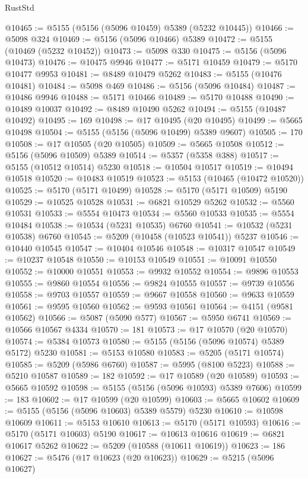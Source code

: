 \begin{lexlean}{RustStd}
\begin{coremodule}
@10465 := @5155 (@5156 (@5096 @10459) @5389 (@5232 @10445))
@10466 := @5098 @324
@10469 := @5156 (@5096 @10466) @5389
@10472 := @5155 (@10469 (@5232 @10452))
@10473 := @5098 @330
@10475 := @5156 (@5096 @10473)
@10476 := @10475 @9946
@10477 := @5171 @10459
@10479 := @5170 @10477 @9953
@10481 := @8489 @10479 @5262
@10483 := @5155 (@10476 @10481)
@10484 := @5098 @469
@10486 := @5156 (@5096 @10484)
@10487 := @10486 @9946
@10488 := @5171 @10466
@10489 := @5170 @10488
@10490 := @10489 @10037
@10492 := @8489 @10490 @5262
@10494 := @5155 (@10487 @10492)
@10495 := 169
@10498 := @17 @10495 (@20 @10495)
@10499 := @5665 @10498
@10504 := @5155 (@5156 (@5096 @10499) @5389 @9607)
@10505 := 170
@10508 := @17 @10505 (@20 @10505)
@10509 := @5665 @10508
@10512 := @5156 (@5096 @10509) @5389
@10514 := @5357 (@5358 @388)
@10517 := @5155 (@10512 @10514) @5230
@10518 := @10504 @10517
@10519 := @10494 @10518
@10520 := @10483 @10519
@10523 := @5153 (@10465 (@10472 @10520))
@10525 := @5170 (@5171 @10499)
@10528 := @5170 (@5171 @10509) @5190
@10529 := @10525 @10528
@10531 := @6821 @10529 @5262
@10532 := @5560 @10531
@10533 := @5554 @10473
@10534 := @5560 @10533
@10535 := @5554 @10484
@10538 := @10534 (@5231 @10535) @6760
@10541 := @10532 (@5231 @10538) @6760
@10545 := @5209 (@10458 (@10523 @10541)) @5237
@10546 := @10440 @10545
@10547 := @10404 @10546
@10548 := @10317 @10547
@10549 := @10237 @10548
@10550 := @10153 @10549
@10551 := @10091 @10550
@10552 := @10000 @10551
@10553 := @9932 @10552
@10554 := @9896 @10553
@10555 := @9860 @10554
@10556 := @9824 @10555
@10557 := @9739 @10556
@10558 := @9703 @10557
@10559 := @9667 @10558
@10560 := @9633 @10559
@10561 := @9595 @10560
@10562 := @9593 @10561
@10564 := @4151 (@9581 @10562)
@10566 := @5087 (@5090 @577)
@10567 := @5950 @6741
@10569 := @10566 @10567 @4334
@10570 := 181
@10573 := @17 @10570 (@20 @10570)
@10574 := @5384 @10573
@10580 := @5155 (@5156 (@5096 @10574) @5389 @5172) @5230
@10581 := @5153 @10580
@10583 := @5205 (@5171 @10574)
@10585 := @5209 (@5986 @6760)
@10587 := @5995 (@8100 @5223)
@10588 := @5210 @10587
@10589 := 182
@10592 := @17 @10589 (@20 @10589)
@10593 := @5665 @10592
@10598 := @5155 (@5156 (@5096 @10593) @5389 @7606)
@10599 := 183
@10602 := @17 @10599 (@20 @10599)
@10603 := @5665 @10602
@10609 := @5155 (@5156 (@5096 @10603) @5389 @5579) @5230
@10610 := @10598 @10609
@10611 := @5153 @10610
@10613 := @5170 (@5171 @10593)
@10616 := @5170 (@5171 @10603) @5190
@10617 := @10613 @10616
@10619 := @6821 @10617 @5262
@10622 := @5209 (@10588 (@10611 @10619))
@10623 := 186
@10627 := @5476 (@17 @10623 (@20 @10623))
@10629 := @5215 (@5096 @10627)

\end{coremodule}
\end{lexlean}

